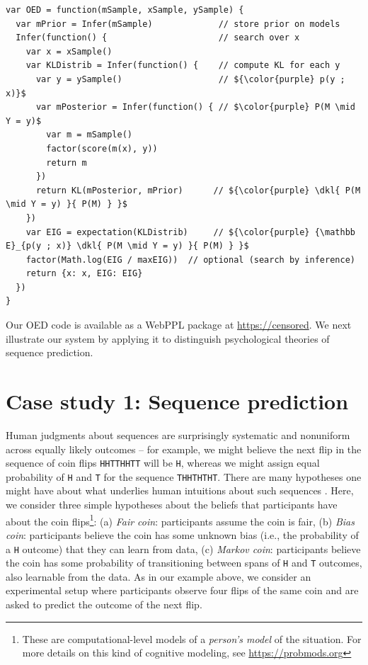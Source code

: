 \documentclass{article}
\newcommand{\dkl}{D_\mathrm{KL}\infdivx}
\newcommand{\ndg}[1]{\textcolor{Green}{[ndg: #1]}}
\begin{document}
\begin{lstlisting}[mathescape, label={code:oed-pp}, caption = {OED implementation. For clarity, we have omitted some book-keeping details.}]
var OED = function(mSample, xSample, ySample) {
  var mPrior = Infer(mSample)             // store prior on models
  Infer(function() {                      // search over x
    var x = xSample()
    var KLDistrib = Infer(function() {    // compute KL for each y
      var y = ySample()                   // ${\color{purple} p(y ; x)}$
      var mPosterior = Infer(function() { // $\color{purple} P(M \mid Y = y)$
        var m = mSample()
        factor(score(m(x), y))
        return m
      })
      return KL(mPosterior, mPrior)      // ${\color{purple} \dkl{ P(M \mid Y = y) }{ P(M) } }$
    })
    var EIG = expectation(KLDistrib)     // ${\color{purple} {\mathbb E}_{p(y ; x)} \dkl{ P(M \mid Y = y) }{ P(M) } }$
    factor(Math.log(EIG / maxEIG))  // optional (search by inference)
    return {x: x, EIG: EIG}
  })
}
\end{lstlisting}
Our OED code is available as a WebPPL package at \url{https://censored}. %
We next illustrate our system by applying it to distinguish psychological theories of sequence prediction.

\section{Case study 1: Sequence prediction}
\label{s:tutorial}

Human judgments about sequences are surprisingly systematic and nonuniform across equally likely outcomes -- for example, we might believe the next flip in the  sequence of coin flips \lstinline{HHTTHHTT} will be \lstinline{H}, whereas we might assign equal probability of \lstinline{H} and \lstinline{T} for the sequence \lstinline{THHTHTHT}.
There are many hypotheses one might have about what underlies human intuitions about such sequences \cite{goodfellow38:jep, falk81:pme, Griffiths2004_nips}.
Here, we consider three simple hypotheses about the beliefs that participants have about the coin flips\footnote{These are computational-level models of a \emph{person's model} of the situation. For more details on this kind of cognitive modeling, see \url{https://probmods.org}}: (a) \emph{Fair coin}: participants assume the coin is fair, (b) \emph{Bias coin}: participants believe the coin has some unknown bias (i.e., the probability of a \lstinline{H} outcome) that they can learn from data, (c) \emph{Markov coin}: participants believe the coin has some probability of transitioning between spans of \lstinline{H} and \lstinline{T} outcomes, also learnable from the data.
As in our example above, we consider an experimental setup where participants observe four flips of the same coin and are asked to predict the outcome of the next flip.
\end{document}
